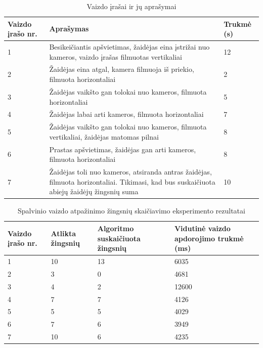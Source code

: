 \documentclass{VUMIFPSbakalaurinis}
\begin{document}
\begin{table}[H]\footnotesize
	\centering
	\caption{Vaizdo įrašai ir jų aprašymai}
	{\begin{tabular}{|p{2cm}|p{8cm}|p{2cm}|} \hline
			\textbf{Vaizdo įrašo nr.} & \textbf{Aprašymas}  & \textbf{Trukmė (s)} \\
			\hline
			1  & Besikeičiantis apšvietimas, žaidėjas eina įstrižai nuo kameros, vaizdo įrašas filmuotas vertikaliai & 12      \\
			\hline
			2  & Žaidėjas eina atgal, kamera filmuoja iš priekio, filmuota horizontaliai          & 2 \\
			\hline
			3  & Žaidėjas vaikšto gan tolokai nuo kameros, filmuota horizontaliai       	 & 5 \\ 
			\hline
			4  & Žaidėjas labai arti kameros, filmuota horizontaliai       
		 	& 7  \\ \hline
			5  & Žaidėjas vaikšto gan tolokai nuo kameros, filmuota vertikaliai, žaidėjas matomas pilnai    & 8    \\
			\hline
			6  & Prastas apšvietimas, žaidėjas gan arti kameros, filmuota horizontaliai       
			& 8 \\
			\hline
			7  & Žaidėjas toli nuo kameros, atsiranda antras žaidėjas, filmuota horizontaliai. Tikimasi, kad bus suskaičiuota abiejų žaidėjų žingsnių suma   & 10     \\
			\hline
	\end{tabular}}
	\label{tab:openposevslightweight}
\end{table}


\begin{table}[H]\footnotesize
	\centering
	\caption{Spalvinio vaizdo atpažinimo žingsnių skaičiavimo eksperimento rezultatai}
	{\begin{tabular}{|p{3cm}|p{3cm}|p{3cm}|p{3cm}|} \hline
			\textbf{Vaizdo įrašo nr.} & \textbf{Atlikta žingsnių} & \textbf{Algoritmo suskaičiuota žingsnių} & \textbf{Vidutinė vaizdo apdorojimo trukmė (ms)} \\
			\hline
			1  & 10    & 13    & 6035    \\
			\hline
			2  & 3    & 0  & 4681     \\
			\hline
			3  & 4    & 2   & 12600    \\
			\hline
			4  & 7    & 7  & 4126     \\
			\hline
			5  & 5    & 5  & 4029     \\
			\hline
			6  & 7    & 6  & 3949     \\
			\hline
			7  & 10    & 6  & 4235     \\
			\hline
	\end{tabular}}
	\label{tab:colorresults}
\end{table}
\end{document}
